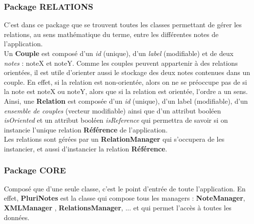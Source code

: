 \documentclass[a4paper]{report}
\begin{document}
\subsubsection{Package RELATIONS}
C'est dans ce package que se trouvent toutes les classes permettant de gérer les relations, au sens mathématique du terme, entre les différentes notes de l'application.\\
Un \textbf{Couple} est composé d'un \textit{id} (unique), d'un \textit{label} (modifiable) et de deux \textit{notes} : noteX et noteY. Comme les couples peuvent appartenir à des relations orientées, il est utile d'orienter aussi le stockage des deux notes contenues dans un couple. En effet, si la relation est non-orientée, alors on ne se préoccupe pas de si la note est noteX ou noteY, alors que si la relation est orientée, l'ordre a un sens.\\
Ainsi, une \textbf{Relation} est composée d'un \textit{id} (unique), d'un label (modifiable), d'un \textit{ensemble de couples} (vecteur modifiable) ainsi que d'un attribut booléen \textit{isOriented} et un attribut booléen \textit{isReference} qui permettra de savoir si on instancie l'unique relation \textbf{Référence} de l'application.\\
Les relations sont gérées par un \textbf{RelationManager} qui s'occupera de les instancier, et aussi d'instancier la relation \textbf{Référence}.

\subsubsection{Package CORE}
Composé que d'une seule classe, c'est le point d'entrée de toute l'application. En effet, \textbf{PluriNotes} est la classe qui compose tous les managers : \textbf{NoteManager}, \textbf{XMLManager} , \textbf{RelationsManager}, ... et qui permet l'accès à toutes les données. \\
\end{document}
